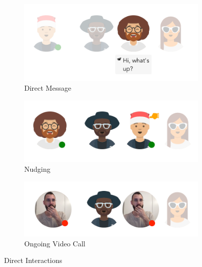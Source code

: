 \begin{figure}[h]
    \centering
    \begin{subfigure}{.3\textwidth}
        \centering
        \includegraphics[width=.9\linewidth]{./images/DM.png}
        \caption{Direct Message}
        \label{fig:dm}
    \end{subfigure}%
    \begin{subfigure}{.3\textwidth}
        \centering
        \includegraphics[width=.9\linewidth]{./images/nudging.png}
        \caption{Nudging}
        \label{fig:nudging}
    \end{subfigure}
    \begin{subfigure}{.3\textwidth}
        \centering
        \includegraphics[width=.9\linewidth]{./images/call.png}
        \caption{Ongoing Video Call }
        \label{fig:call}
    \end{subfigure}
    \caption{Direct Interactions}
    \label{fig:interaction_results}
\end{figure}